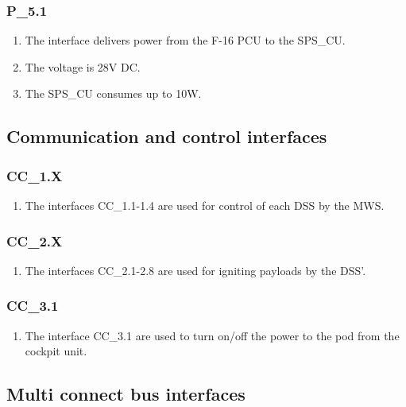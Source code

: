 \documentclass[Main]{subfiles}
\begin{document}
\subsubsection{P\_5.1}
\begin{enumerate}[label = \bfseries ID-4.\arabic*]
\item The interface delivers power from the F-16 PCU to the SPS\_CU. 
\item The voltage is 28V DC. 
\item The SPS\_CU consumes up to 10W.
\end{enumerate}

\subsection{Communication and control interfaces}

\subsubsection{CC\_1.X}
\begin{enumerate}[label = \bfseries ID-5.\arabic*]
\item The interfaces CC\_1.1-1.4 are used for control of each DSS by the MWS. 
\end{enumerate}

\subsubsection{CC\_2.X}
\begin{enumerate}[label = \bfseries ID-6.\arabic*]
\item The interfaces CC\_2.1-2.8 are used for igniting payloads by the DSS'.
\end{enumerate}

\subsubsection{CC\_3.1}
\begin{enumerate}[label = \bfseries ID-7.\arabic*]
\item The interface CC\_3.1 are used to turn on/off the power to the pod from the cockpit unit.
\end{enumerate}


\subsection{Multi connect bus interfaces}
\end{document}
